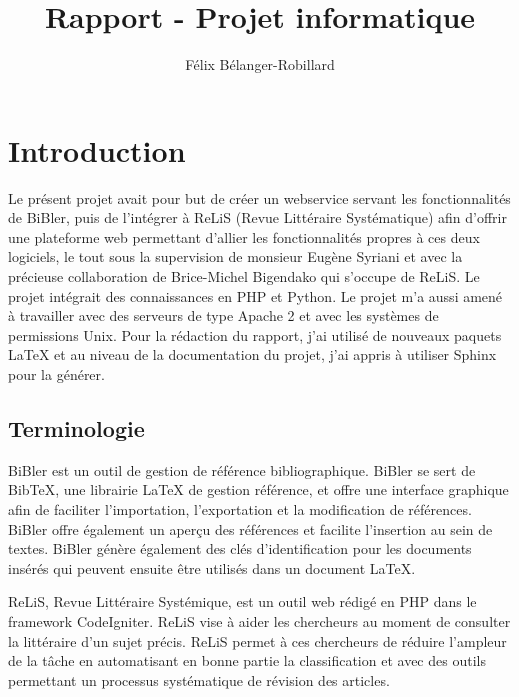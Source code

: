 \documentclass[12pt,titlepage]{article}
\author{Félix Bélanger-Robillard}
\title{Rapport - Projet informatique}
\let\oldsection\section
\renewcommand\section{\clearpage\oldsection}
\begin{document}
\maketitle

\tableofcontents
\newpage

\section{Introduction}
Le présent projet avait pour but de créer un webservice servant les fonctionnalités de BiBler, puis de l'intégrer à ReLiS (Revue Littéraire Systématique) afin d'offrir une plateforme web permettant d'allier les fonctionnalités propres à ces deux logiciels, le tout sous la supervision de monsieur Eugène Syriani et avec la précieuse collaboration de Brice-Michel Bigendako qui s'occupe de ReLiS. Le projet intégrait des connaissances en PHP et Python. Le projet m'a aussi amené à travailler avec des serveurs de type Apache 2 et avec les systèmes de permissions Unix. Pour la rédaction du rapport, j'ai utilisé de nouveaux paquets LaTeX et au niveau de la documentation du projet, j'ai appris à utiliser Sphinx pour la générer.  \newline

\subsection{Terminologie}
BiBler est un outil de gestion de référence bibliographique. BiBler se sert de BibTeX, une librairie LaTeX de gestion référence, et offre une interface graphique afin de faciliter l'importation, l'exportation et la modification de références. BiBler offre également un aperçu des références et facilite l'insertion au sein de textes. BiBler génère également des clés d'identification pour les documents insérés qui peuvent ensuite être utilisés dans un document LaTeX.  \newline

ReLiS, Revue Littéraire Systémique, est un outil web rédigé en PHP dans le framework CodeIgniter. ReLiS vise à aider les chercheurs au moment de consulter la littéraire d'un sujet précis. ReLiS permet à ces chercheurs de réduire l'ampleur de la tâche en automatisant en bonne partie la classification et avec des outils permettant un processus systématique de révision des articles. \newline
\end{document}
